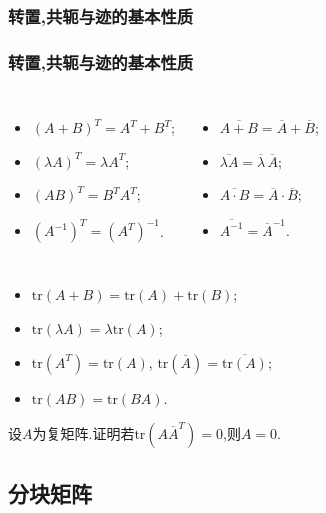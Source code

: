 \subsubsection{转置,共轭与迹的基本性质}
\begin{frame}\frametitle{转置,共轭与迹的基本性质}
\begin{lemma}[转置和共轭的基本性质]
\begin{columns}[c]
\column{4cm}
\begin{itemize}
\item $(A+B)^T=A^T+B^T$; \pp
\item $(\lambda A)^T=\lambda A^T$; \pp
\item  $(AB)^T=B^TA^T$; \pp
\item $(A^{-1})^T=(A^T)^{-1}$. \pp
\end{itemize}
\column{4cm}
\begin{itemize}
\item $\overline{A+B}=\overline{A}+\overline{B}$; \pp
\item $\overline{\lambda A}=\overline{\lambda}\,\overline{A}$; \pp
\item $\overline{A\cdot B}=\overline{A}\cdot\overline{B}$; \pp
\item $\overline{A^{-1}}=\overline{A}^{-1}$. \pp
\end{itemize}
\end{columns}
\end{lemma}

\begin{lemma}[迹的基本性质]
\begin{itemize}
\item $\mathrm{tr}(A+B)=\mathrm{tr}(A)+\mathrm{tr}(B)$; \pp
\item $\mathrm{tr}(\lambda A)=\lambda\mathrm{tr}(A)$; \pp
\item $\mathrm{tr}(A^T)=\mathrm{tr}(A)$, \quad \pp  $\mathrm{tr}(\overline{A})=\overline{\mathrm{tr}(A)}$; \pp
\item $\mathrm{tr}(AB)=\mathrm{tr}(BA)$.
\end{itemize}
\end{lemma}
\pp

\begin{example}设$A$为复矩阵.证明若$\mathrm{tr}(A\overline{A}^T)=0$,则$A=0$.
\end{example}
\end{frame}



\subsection{分块矩阵}



